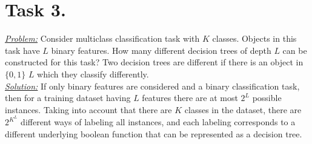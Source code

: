 \documentclass[a4paper,12pt]{article}
\begin{document}
\section*{Task 3.}
\underline{\textit{Problem:}} Consider multiclass
classification task with \(K\) classes. Objects in this task have \(L\) binary
features.  How many different decision trees of depth \(L\) can be constructed
for this task? Two decision trees are different if there is an object in \(\{0,
1\}\) \(L\) which they classify differently.\\
\newline
\underline{\textit{Solution:}} If only binary features are considered and a
binary classification task, then for a training dataset having $L$ features
there are at most \(2^L\) possible instances. Taking into account that there
are $K$ classes in the dataset, there are \(2^{K^L}\) different ways of labeling
all instances, and each labeling corresponds to a different underlying boolean
function that can be represented as a decision tree.
\end{document}
